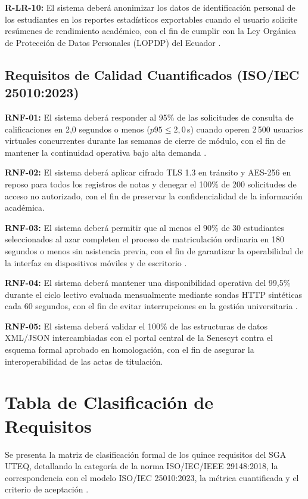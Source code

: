\documentclass[conference]{IEEEtran}
\newcommand{\req}[1]{\noindent\textbf{#1:}\enspace}
\begin{document}
	\req{R-LR-10} El sistema deberá anonimizar los datos de identificación personal de los estudiantes en los reportes estadísticos exportables cuando el usuario solicite resúmenes de rendimiento académico, con el fin de cumplir con la Ley Orgánica de Protección de Datos Personales (LOPDP) del Ecuador \cite{lopdp2021}.
	
	\subsection{Requisitos de Calidad Cuantificados (ISO/IEC 25010:2023)}
	\req{RNF-01} El sistema deberá responder al 95\% de las solicitudes de consulta de calificaciones en 2,0 segundos o menos ($p95 \le 2{,}0$\,s) cuando operen 2\,500 usuarios virtuales concurrentes durante las semanas de cierre de módulo, con el fin de mantener la continuidad operativa bajo alta demanda \cite{jmeter}.
	
	\req{RNF-02} El sistema deberá aplicar cifrado TLS 1.3 en tránsito y AES-256 en reposo para todos los registros de notas y denegar el 100\% de 200 solicitudes de acceso no autorizado, con el fin de preservar la confidencialidad de la información académica.
	
	\req{RNF-03} El sistema deberá permitir que al menos el 90\% de 30 estudiantes seleccionados al azar completen el proceso de matriculación ordinaria en 180 segundos o menos sin asistencia previa, con el fin de garantizar la operabilidad de la interfaz en dispositivos móviles y de escritorio \cite{iso9241_11}.
	
	\req{RNF-04} El sistema deberá mantener una disponibilidad operativa del 99,5\% durante el ciclo lectivo evaluada mensualmente mediante sondas HTTP sintéticas cada 60 segundos, con el fin de evitar interrupciones en la gestión universitaria \cite{uptimekuma}.
	
	\req{RNF-05} El sistema deberá validar el 100\% de las estructuras de datos XML/JSON intercambiadas con el portal central de la Senescyt contra el esquema formal aprobado en homologación, con el fin de asegurar la interoperabilidad de las actas de titulación.
	
	\section{Tabla de Clasificación de Requisitos}
	Se presenta la matriz de clasificación formal de los quince requisitos del SGA UTEQ, detallando la categoría de la norma ISO/IEC/IEEE 29148:2018, la correspondencia con el modelo ISO/IEC 25010:2023, la métrica cuantificada y el criterio de aceptación \cite{ieee29148, iso25010}.
	
\end{document}
